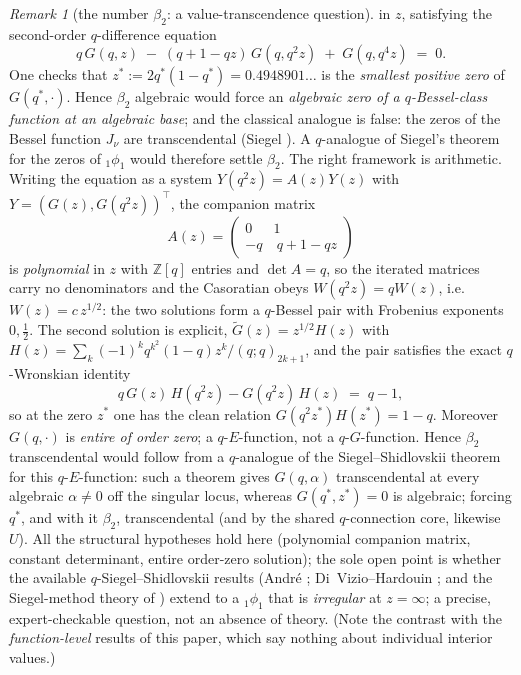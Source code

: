 \documentclass[11pt]{article}
\theoremstyle{plain}
\theoremstyle{definition}
\theoremstyle{remark}
\newtheorem{remark}[theorem]{Remark}
\newcommand{\Z}{\mathbb{Z}}
\begin{document}
\begin{remark}[the number $\beta_2$: a value-transcendence question]
in $z$, satisfying the second-order $q$-difference equation
\[
   q\,G(q,z)\;-\;(q+1-qz)\,G(q,q^2z)\;+\;G(q,q^4z)\;=\;0 .
\]
One checks that $z^\ast:=2q^\ast(1-q^\ast)=0.4948901\ldots$ is the \emph{smallest positive zero} of
$G(q^\ast,\cdot)$. Hence $\beta_2$ algebraic would force an \emph{algebraic zero of a $q$-Bessel-class
function at an algebraic base}; and the classical analogue is false: the zeros of the Bessel function
$J_\nu$ are transcendental (Siegel \cite{Siegel1929}). A $q$-analogue of Siegel's theorem for the zeros of ${}_1\phi_1$
would therefore settle $\beta_2$. The right framework is arithmetic. Writing the equation as a system $Y(q^2z)=A(z)Y(z)$ with
$Y=(G(z),G(q^2z))^{\!\top}$, the companion matrix
\[
   A(z)=\begin{pmatrix}0&1\\-q&\ q+1-qz\end{pmatrix}
\]
is \emph{polynomial} in $z$ with $\Z[q]$ entries and $\det A=q$, so the iterated matrices carry no
denominators and the Casoratian obeys $W(q^2z)=qW(z)$, i.e.\ $W(z)=c\,z^{1/2}$: the two solutions form a
$q$-Bessel pair with Frobenius exponents $0,\tfrac12$. The second solution is explicit,
$\widetilde G(z)=z^{1/2}H(z)$ with $H(z)=\sum_k(-1)^kq^{k^2}(1-q)z^k/(q;q)_{2k+1}$, and the pair satisfies
the exact $q$-Wronskian identity
\[
   q\,G(z)\,H(q^2z)-G(q^2z)\,H(z)\;=\;q-1 ,
\]
so at the zero $z^\ast$ one has the clean relation $G(q^2z^\ast)H(z^\ast)=1-q$. Moreover $G(q,\cdot)$ is
\emph{entire of order zero}; a $q$-$E$-function, not a $q$-$G$-function. Hence $\beta_2$ transcendental would follow from a
$q$-analogue of the Siegel--Shidlovskii theorem for this $q$-$E$-function: such a theorem gives
$G(q,\alpha)$ transcendental at every algebraic $\alpha\ne0$ off the singular locus, whereas
$G(q^\ast,z^\ast)=0$ is algebraic; forcing $q^\ast$, and with it $\beta_2$, transcendental (and by the
shared $q$-connection core, likewise $U$). All the structural hypotheses hold here (polynomial companion
matrix, constant determinant, entire order-zero solution); the sole open point is whether the available
$q$-Siegel--Shidlovskii results \textup{(Andr\'e \cite{Andre2000}; Di~Vizio--Hardouin
\cite{DiVizioHardouin2012}; and the Siegel-method theory of \cite{AMV2007})} extend to a ${}_1\phi_1$ that is
\emph{irregular} at $z=\infty$; a precise, expert-checkable question, not an absence of theory. (Note
the contrast with the \emph{function-level} results of this paper, which say nothing about individual
interior values.)


\end{remark}
\end{document}
